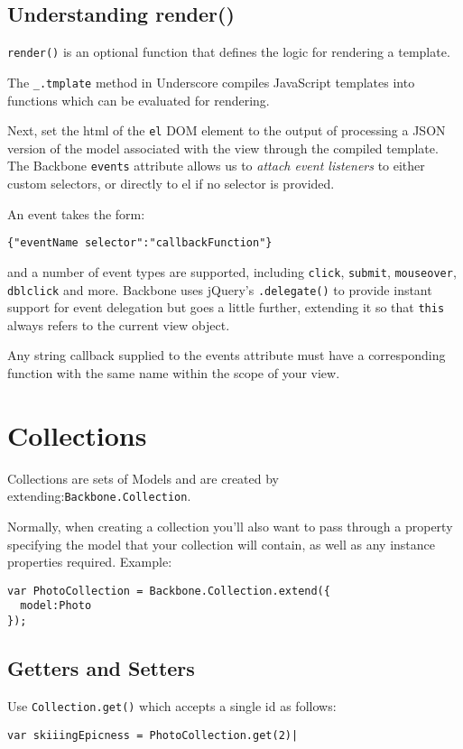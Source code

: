 \documentclass[a4paper, 11pt]{book}
\begin{document}
\subsection{Understanding render()}
\verb|render()| is an optional function that defines the logic for rendering a
template. 

The \verb|_.tmplate| method in Underscore compiles JavaScript templates into
functions which can be evaluated for rendering.

Next, set the html of the \verb|el| DOM element to the output of processing a
JSON version of the model associated with the view through the compiled
template.
The Backbone \verb|events| attribute allows us to \emph{attach event listeners}
to either custom selectors, or directly to el if no selector is provided. 

An event takes the form:
\begin{verbatim}
{"eventName selector":"callbackFunction"}
\end{verbatim}
and a number of event types are supported, including \verb|click|,
\verb|submit|, \verb|mouseover|, \verb|dblclick| and more.
Backbone uses jQuery's \verb|.delegate()| to provide instant support for event
delegation but goes a little further, extending it so that \verb|this| always
refers to the current view object. 

Any string callback supplied to the events attribute must have a corresponding
function with the same name within the scope of your view.
\section{Collections}
Collections are sets of Models and are created by
extending:\verb|Backbone.Collection|.

Normally, when creating a collection you'll also want to pass through a property
specifying the model that your collection will contain, as well as any instance
properties required. Example:
\begin{verbatim}
var PhotoCollection = Backbone.Collection.extend({
  model:Photo
});
\end{verbatim}

\subsection{Getters and Setters}
Use \verb|Collection.get()| which accepts a single id as follows:
\begin{verbatim}
var skiiingEpicness = PhotoCollection.get(2)|
\end{verbatim}
\end{document}

